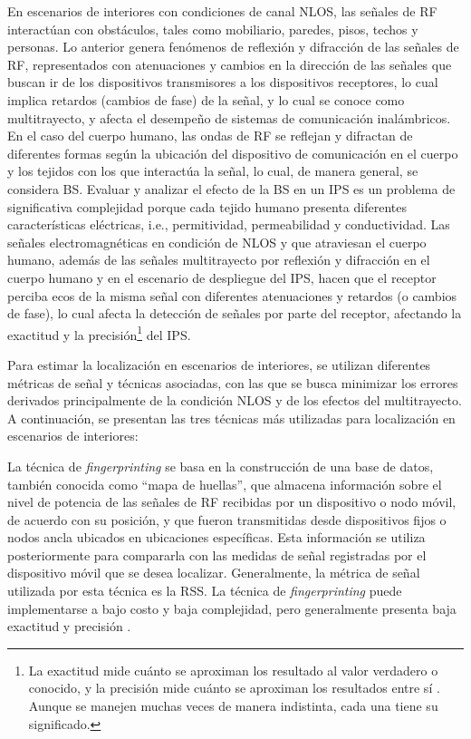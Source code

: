 En escenarios de interiores con condiciones de canal NLOS, las señales de RF interactúan con obstáculos, tales como mobiliario, paredes, pisos, techos y personas. Lo anterior genera fenómenos de reflexión y difracción de las señales de RF, representados con atenuaciones y cambios en la dirección de las señales que buscan ir de los dispositivos transmisores a los dispositivos receptores, lo cual implica retardos (cambios de fase) de la señal, y lo cual se conoce como multitrayecto, y afecta el desempeño de sistemas de comunicación inalámbricos. En el caso del cuerpo humano, las ondas de RF se reflejan y difractan de diferentes formas según la ubicación del dispositivo de comunicación en el cuerpo y los tejidos con los que interactúa la señal, lo cual, de manera general, se considera BS. Evaluar y analizar el efecto de la BS en un IPS es un problema de significativa complejidad porque cada tejido humano presenta diferentes características eléctricas, i.e., permitividad, permeabilidad y conductividad. Las señales electromagnéticas en condición de NLOS y que atraviesan el cuerpo humano, además de las señales multitrayecto por reflexión y difracción en el cuerpo humano y en el escenario de despliegue del IPS, hacen que el receptor perciba ecos de la misma señal con diferentes atenuaciones y retardos (o cambios de fase), lo cual afecta la detección de señales por parte del receptor, afectando la exactitud y la precisión\footnote{La exactitud mide cuánto se aproximan los resultado al valor verdadero o conocido, y la precisión mide cuánto se aproximan los resultados entre sí \cite{ref5}. Aunque se manejen muchas veces de manera indistinta, cada una tiene su significado.} del IPS.

Para estimar la localización en escenarios de interiores, se utilizan diferentes métricas de señal y técnicas asociadas, con las que se busca minimizar los errores derivados principalmente de la condición NLOS y de los efectos del multitrayecto. A continuación, se presentan las tres técnicas más utilizadas para localización en escenarios de interiores:

La técnica de \textit{fingerprinting} se basa en la construcción de una base de datos, también conocida como “mapa de huellas”, que almacena información sobre el nivel de potencia de las señales de RF recibidas por un dispositivo o nodo móvil, de acuerdo con su posición, y que fueron transmitidas desde dispositivos fijos o nodos ancla ubicados en ubicaciones específicas. Esta información se utiliza posteriormente para compararla con las medidas de señal registradas por el dispositivo móvil que se desea localizar. Generalmente, la métrica de señal utilizada por esta técnica es la RSS. La técnica de \textit{fingerprinting} puede implementarse a bajo costo y baja complejidad, pero generalmente presenta baja exactitud y precisión \cite{ref6, ref7}.

